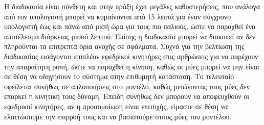Η διαδικασία είναι σύνθετη και στην πράξη έχει μεγάλες καθυστερήσεις, που ανάλογα από τον υπολογιστή μπορεί να κυμαίνονται από 15 λεπτά για έναν σύγχρονο υπολογιστή έως και πάνω από μισή ώρα για τους πιο παλιούς, ώστε να παραχθεί ένα αποτέλεσμα διάρκειας μισού λεπτού. Επίσης η διαδικασία μπορεί να διακοπεί αν δεν πληρούνται τα επιτρεπτά όρια ανοχής σε σφάλματα. Συχνά για την βελτίωση της διαδικασίας εισάγονται επιπλέον εφεδρικοί κινητήρες στις αρθρώσεις για να παρέχουν την απαραίτητη ροπή, ώστε να παραχθεί η κίνηση, καθώς οι μύες μπορεί να μην είναι σε θέση να οδηγήσουν το σύστημα στην επιθυμητή κατάσταση. Το τελευταίο οφείλεται συνήθως σε απλοποιήσεις στο μοντέλο, καθώς μειώνοντας τους μύες δεν επαρκεί η κινητική τους δύναμη. Επειδή συνήθως δεν μπορούν να αποφευχθούν οι εφεδρικοί κινητήρες, αν η προσομοίωση είναι επιτυχής, είμαστε σε θέση να ελαττώσουμε την επιρροή τους και να βασιστούμε στους μύες του μοντέλου.

